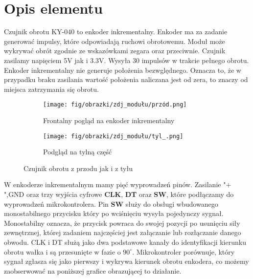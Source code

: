 \documentclass[11pt, a4paper]{article}
\author{Hubert Pietrzak}
\institute{Instytut Robotyki i Inteligencji Maszynowej}
\begin{document}
\newpage

\section*{Opis elementu} 

Czujnik obrotu KY-040 to enkoder inkrementalny. Enkoder ma za zadanie generować impulsy, które odpowiadają ruchowi obrotowemu. Moduł może wykrywać obrót zgodnie ze wskazówkami zegara oraz przeciwnie. Czujnik zasilamy napięciem 5V jak i 3.3V. Wysyła 30 impulsów w trakcie pełnego obrotu. Enkoder inkrementalny nie generuje położenia bezwględnego. Oznacza to, że w przypadku braku zasilania wartość położenia naliczana jest od zera, to znaczy od miejsca zatrzymania się obrotu.


\vspace{0.5cm}
\begin{figure}[h]
\centering
\begin{subfigure}{.5\textwidth}
  \centering
  \texttt{[image: fig/obrazki/zdj\_modułu/przód.png]}
  \caption{Frontalny pogląd na enkoder inkrementalny}
  \label{fig:sub1}
\end{subfigure}%
\begin{subfigure}{.5\textwidth}
  \centering
  \texttt{[image: fig/obrazki/zdj\_modułu/tyl\_.png]}
  \caption{Podgląd na tylną część}
  \label{fig:sub2}
\end{subfigure}
\caption{Czujnik obrotu z przodu jak i z tyłu}
\label{fig:test}
\end{figure}
\vspace{0.5cm}


W enkoderze inkrementalnym mamy pięć wyprowadzeń pinów. Zasilanie "$+$",GND oraz trzy wyjścia cyfrowe \textbf{CLK}, \textbf{DT} oraz \textbf{SW}, które podłączamy do wyprowadzeń mikrokontrolera. Pin \textbf{SW} służy do obsługi wbudowanego monostabilnego przycisku który po wciśnięciu wysyła pojedynczy sygnał. Monostabilny oznacza, że przycisk powraca do swojej pozycji po usunięciu siły zewnętrznej, której zadaniem najczęściej jest załączanie lub rozłączanie danego obwodu. CLK i DT służą jako dwa podstawowe kanały do identyfikacji kierunku obrotu wałka i są przesunięte w fazie o $90^{\circ}$. Mikrokontroler porównuje, który sygnał zgłasza się jako pierwszy i wykrywa kierunek obrotu enkodera, co możemy zaobserwować na poniższej grafice obrazującej to działanie.
\end{document}
